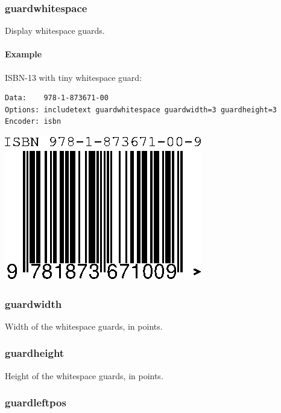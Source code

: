\hypertarget{guardwhitespace}{%
\subsubsection{guardwhitespace}\label{guardwhitespace}}

Display whitespace guards.

\hypertarget{example-37}{%
\paragraph{Example}\label{example-37}}

ISBN-13 with tiny whitespace guard:

\begin{verbatim}
Data:    978-1-873671-00
Options: includetext guardwhitespace guardwidth=3 guardheight=3
Encoder: isbn
\end{verbatim}

\includegraphics{images/optguardsize.eps}

\hypertarget{guardwidth}{%
\subsubsection{guardwidth}\label{guardwidth}}

Width of the whitespace guards, in points.

\hypertarget{guardheight}{%
\subsubsection{guardheight}\label{guardheight}}

Height of the whitespace guards, in points.

\hypertarget{guardleftpos}{%
\subsubsection{guardleftpos}\label{guardleftpos}}

